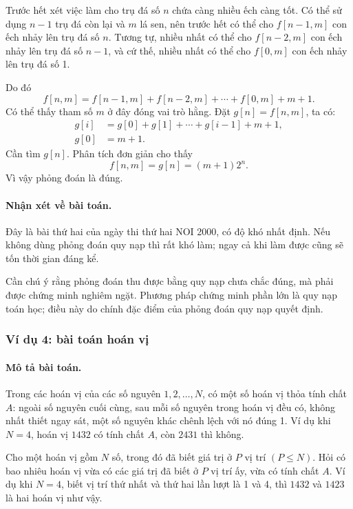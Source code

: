 \documentclass[11pt]{article}
\begin{document}
Trước hết xét việc làm cho trụ đá số \(n\) chứa càng nhiều ếch càng tốt. Có
thể sử dụng \(n-1\) trụ đá còn lại và \(m\) lá sen, nên trước hết có thể cho
\(f[n-1,m]\) con ếch nhảy lên trụ đá số \(n\). Tương tự, nhiều nhất có thể
cho \(f[n-2,m]\) con ếch nhảy lên trụ đá số \(n-1\), và cứ thế, nhiều nhất
có thể cho \(f[0,m]\) con ếch nhảy lên trụ đá số 1.

Do đó
\[
  f[n,m]=f[n-1,m]+f[n-2,m]+\cdots+f[0,m]+m+1.
\]
Có thể thấy tham số \(m\) ở đây đóng vai trò hằng. Đặt \(g[n]=f[n,m]\), ta
có:
\[
\begin{aligned}
g[i]&=g[0]+g[1]+\cdots+g[i-1]+m+1,\\
g[0]&=m+1.
\end{aligned}
\]
Cần tìm \(g[n]\). Phân tích đơn giản cho thấy
\[
  f[n,m]=g[n]=(m+1)2^n.
\]
Vì vậy phỏng đoán là đúng.

\paragraph{Nhận xét về bài toán.}
Đây là bài thứ hai của ngày thi thứ hai NOI 2000, có độ khó nhất định. Nếu
không dùng phỏng đoán quy nạp thì rất khó làm; ngay cả khi làm được cũng sẽ
tốn thời gian đáng kể.

Cần chú ý rằng phỏng đoán thu được bằng quy nạp chưa chắc đúng, mà phải được
chứng minh nghiêm ngặt. Phương pháp chứng minh phần lớn là quy nạp toán học;
điều này do chính đặc điểm của phỏng đoán quy nạp quyết định.

\subsubsection*{Ví dụ 4: bài toán hoán vị}

\paragraph{Mô tả bài toán.}
Trong các hoán vị của các số nguyên \(1,2,\ldots,N\), có một số hoán vị thỏa
tính chất \(A\): ngoài số nguyên cuối cùng, sau mỗi số nguyên trong hoán vị
đều có, không nhất thiết ngay sát, một số nguyên khác chênh lệch với nó đúng
1. Ví dụ khi \(N=4\), hoán vị \(1432\) có tính chất \(A\), còn \(2431\) thì
không.

Cho một hoán vị gồm \(N\) số, trong đó đã biết giá trị ở \(P\) vị trí
\((P\le N)\). Hỏi có bao nhiêu hoán vị vừa có các giá trị đã biết ở \(P\) vị
trí ấy, vừa có tính chất \(A\). Ví dụ khi \(N=4\), biết vị trí thứ nhất và
thứ hai lần lượt là 1 và 4, thì \(1432\) và \(1423\) là hai hoán vị như vậy.
\end{document}
